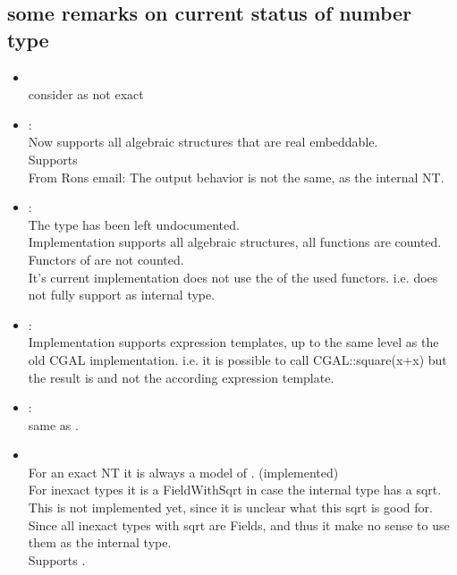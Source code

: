 \subsection{some remarks on current status of number type}
\begin{itemize}
\item  {}\\
       consider  as not exact
\item {}:\\
      Now supports all algebraic structures that are real embeddable.\\
      Supports \\ 
      From Rons email: The output behavior is not the same, as the internal NT. 

\item {}:\\
        The type has been left undocumented.\\
        Implementation supports all algebraic structures, all functions are counted.\\
        Functors of  are not counted. \\
        It's current implementation does not use the  of the used 
        functors. i.e. does not fully support  as internal type.

\item {}:\\
       Implementation supports expression templates, 
       up to the same level as the old CGAL implementation.       
       i.e. it is possible to call CGAL::square(x+x) but the result is 
        and not the according expression template.  

\item {}:\\
        same as .

\item {}\\
        For an exact NT it is always a model of . (implemented)\\
        For inexact types it is a FieldWithSqrt in case the internal type has a sqrt.
        This is not implemented yet, since it is unclear what this sqrt is good for. 
        Since all inexact types with sqrt are Fields, and thus it make no sense to use 
        them as the internal type.  \\
        Supports . 
\end{itemize}
